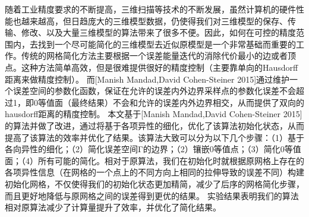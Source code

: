 
\begin{cabstract}
随着工业精度要求的不断提高，三维扫描等技术的不断发展，虽然计算机的硬件性能也越来越高，但日趋庞大的三维模型数据，仍使得我们对三维模型的保存、传输、修改、以及大量三维模型的算法带来了很多不便。因此，如何在可控的精度范围内，去找到一个尽可能简化的三维模型去近似原模型是一个非常基础而重要的工作。传统的网格简化方法主要根据一个误差能量迭代的消除代价最小的边或者顶点。这种方法简单高效，但是很难提供很好的精度控制（主要靠单向的Hausdorff距离来做精度控制）。 而[Manish Mandad,David Cohen-Steiner 2015]通过维护一个误差空间的参数化函数，保证在允许的误差内外边界采样点的参数化误差不会超过1，即0等值面（最终结果）不会和允许的误差内外边界相交，从而提供了双向的hausdorff距离的精度控制。
本文基于[Manish Mandad,David Cohen-Steiner 2015]的算法并做了改进，通过将基于各项异性的细化，优化了该算法初始化状态，从而提高了该算法的效率并优化了结果。该算法大致可以分为以下几个步骤：（1）基于各向异性的细化；（2）简化误差空间Γ的边界；（2）镶嵌0等值点；（3）简化0等值面；（4）所有可能的简化。相对于原算法，我们在初始化时就根据原网格上存在的各项异性信息（在网格的一个点上的不同方向上相同的拉伸导致的误差不同）构建初始化网格，不仅使得我们的初始化状态更加精简，减少了后序的网格简化步骤，而且更好地降低与原网格之间的误差得到更优的结果。
实验结果表明我们的算法相对原算法减少了计算量提升了效率，并优化了简化结果。



\end{cabstract}


